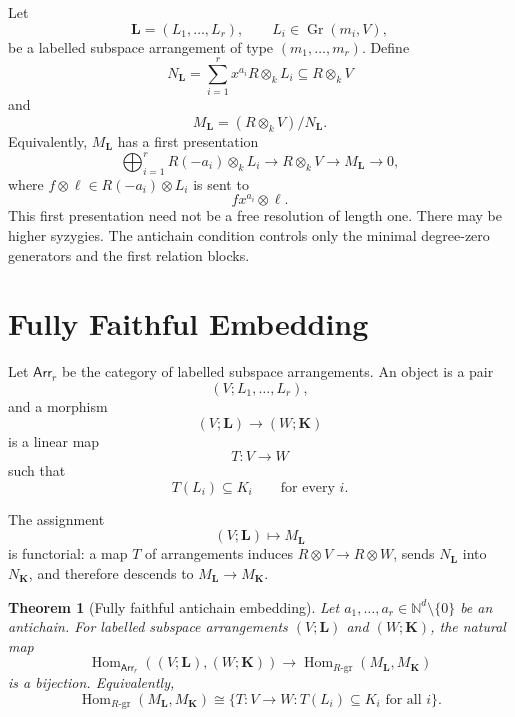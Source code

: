 \documentclass[11pt]{article}
\newtheorem{theorem}{Theorem}[section]
\begin{document}
Let
\[
\mathbf L=(L_1,\ldots,L_r),
\qquad
L_i\in\operatorname{Gr}(m_i,V),
\]
be a labelled subspace arrangement of type \((m_1,\ldots,m_r)\). Define
\[
N_{\mathbf L}
=
\sum_{i=1}^r x^{a_i}R\otimes_k L_i
\subseteq
R\otimes_k V
\]
and
\[
M_{\mathbf L}
=
(R\otimes_k V)/N_{\mathbf L}.
\]
Equivalently, \(M_{\mathbf L}\) has a first presentation
\[
\bigoplus_{i=1}^r R(-a_i)\otimes_k L_i
\longrightarrow
R\otimes_k V
\longrightarrow
M_{\mathbf L}
\longrightarrow 0,
\]
where \(f\otimes \ell\in R(-a_i)\otimes L_i\) is sent to
\[
fx^{a_i}\otimes\ell.
\]
This first presentation need not be a free resolution of length one. There may be higher syzygies. The antichain condition controls only the minimal degree-zero generators and the first relation blocks.

\section{Fully Faithful Embedding}

Let \(\mathsf{Arr}_r\) be the category of labelled subspace arrangements. An object is a pair
\[
(V;L_1,\ldots,L_r),
\]
and a morphism
\[
(V;\mathbf L)\to(W;\mathbf K)
\]
is a linear map
\[
T:V\to W
\]
such that
\[
T(L_i)\subseteq K_i
\qquad
\text{for every }i.
\]

The assignment
\[
(V;\mathbf L)\longmapsto M_{\mathbf L}
\]
is functorial: a map \(T\) of arrangements induces \(R\otimes V\to R\otimes W\), sends \(N_{\mathbf L}\) into \(N_{\mathbf K}\), and therefore descends to \(M_{\mathbf L}\to M_{\mathbf K}\).

\begin{theorem}[Fully faithful antichain embedding]
Let \(a_1,\ldots,a_r\in\mathbb N^d\setminus\{0\}\) be an antichain. For labelled subspace arrangements \((V;\mathbf L)\) and \((W;\mathbf K)\), the natural map
\[
\operatorname{Hom}_{\mathsf{Arr}_r}((V;\mathbf L),(W;\mathbf K))
\longrightarrow
\operatorname{Hom}_{R\text{-gr}}(M_{\mathbf L},M_{\mathbf K})
\]
is a bijection. Equivalently,
\[
\operatorname{Hom}_{R\text{-gr}}(M_{\mathbf L},M_{\mathbf K})
\cong
\{T:V\to W: T(L_i)\subseteq K_i\text{ for all }i\}.
\]
\end{theorem}
\end{document}
